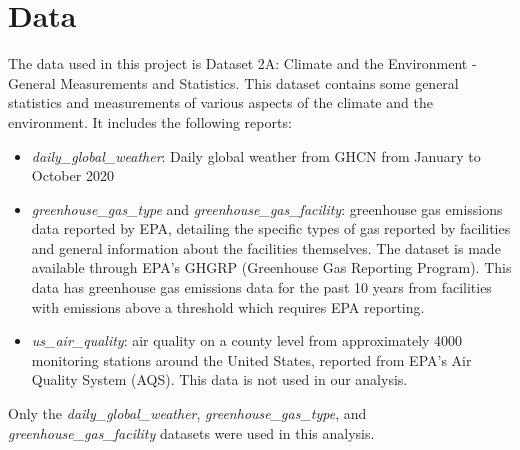 \section{Data}
The data used in this project is Dataset 2A: Climate and the Environment - General Measurements and Statistics. This dataset contains some general statistics and measurements of various aspects of the climate and the environment. It includes the following reports:
\begin{itemize}
    \item \textit{daily\_global\_weather}: Daily global weather from GHCN from January to October 2020
    \item \textit{greenhouse\_gas\_type} and \textit{greenhouse\_gas\_facility}: greenhouse gas emissions data reported by EPA, detailing the specific types of gas reported by facilities and general information about the facilities themselves. The dataset is made available through EPA’s GHGRP (Greenhouse Gas Reporting Program). This data has greenhouse gas emissions data for the past 10 years from facilities with emissions above a threshold which requires EPA reporting. 
    \item \textit{us\_air\_quality}: air quality on a county level from approximately 4000 monitoring stations around the United States, reported from EPA’s Air Quality System (AQS). This data is not used in our analysis. 
\end{itemize}

Only the \textit{daily\_global\_weather}, \textit{greenhouse\_gas\_type}, and \textit{greenhouse\_gas\_facility} datasets were used in this analysis.

